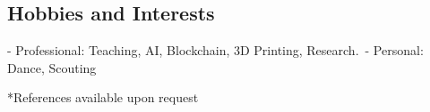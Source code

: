 \documentclass[letterpaper]{twentysecondcv_en} %
\begin{document}

\subsection{Hobbies and Interests}

- Professional: Teaching, AI, Blockchain, 3D Printing, Research.\
- Personal: Dance, Scouting

*References available upon request
\end{document}
